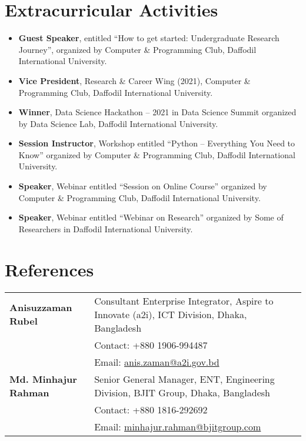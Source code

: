 \documentclass[a4paper, 12pt]{article}
\begin{document}
	\section{\textbf{Extracurricular Activities}}

	\begin{itemize}[leftmargin=*,itemsep=2pt,parsep=0pt]
		\item \textbf{Guest Speaker}, entitled “How to get started: Undergraduate
			Research Journey”, organized by Computer \& Programming Club, Daffodil
			International University.

		\item \textbf{Vice President}, Research \& Career Wing (2021), Computer \&
			Programming Club, Daffodil International University.

		\item \textbf{Winner}, Data Science Hackathon – 2021 in Data Science Summit organized
			by Data Science Lab, Daffodil International University.

		\item \textbf{Session Instructor}, Workshop entitled “Python – Everything You
			Need to Know” organized by Computer \& Programming Club, Daffodil
			International University.

		\item \textbf{Speaker}, Webinar entitled “Session on Online Course” organized
			by Computer \& Programming Club, Daffodil International University.

		\item \textbf{Speaker}, Webinar entitled “Webinar on Research” organized by Some
			of Researchers in Daffodil International University.
	\end{itemize}

	\section{\textbf{References}}
	\begin{tabularx}
		{\linewidth}{@{}l X@{}}

		\textbf{Anisuzzaman Rubel} & Consultant \textendash Enterprise Integrator, Aspire
		to Innovate (a2i),
		\newline
		ICT Division, Dhaka, Bangladesh \\ & Contact: +880 1906-994487 \\ & Email: \href{mailto:anis.zaman@a2i.gov.bd}{anis.zaman@a2i.gov.bd}
		\\[3.75pt]

		\textbf{Md. Minhajur Rahman} & Senior General Manager, ENT\textendash4, Engineering
		Division,
		\newline
		BJIT Group, Dhaka, Bangladesh \\ & Contact: +880 1816-292692 \\ & Email: \href{mailto:minhajur.rahman@bjitgroup.com}{minhajur.rahman@bjitgroup.com}
		\\[3.75pt]
	\end{tabularx}

	\vfill
\end{document}
